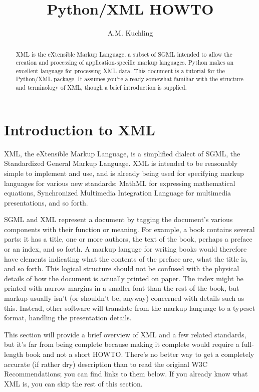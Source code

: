 \documentclass{howto}
\title{Python/XML HOWTO}
\author{A.M. Kuchling}
\begin{document}
\maketitle

\begin{abstract}
\noindent
XML is the eXtensible Markup Language, a subset of SGML intended to
allow the creation and processing of application-specific markup
languages.  Python makes an excellent language for processing XML
data.  This document is a tutorial for the Python/XML package.  It
assumes you're already somewhat familiar with the structure and
terminology of XML, though a brief introduction is supplied.
\end{abstract}

\tableofcontents


\section{Introduction to XML\label{section-introduction}}

XML, the eXtensible Markup Language, is a simplified dialect of SGML,
the Standardized General Markup Language.  XML is intended to be
reasonably simple to implement and use, and is already being used for
specifying markup languages for various new standards: MathML for
expressing mathematical equations, Synchronized Multimedia Integration
Language for multimedia presentations, and so forth.

SGML and XML represent a document by tagging the document's various
components with their function or meaning.  For example, a book
contains several parts: it has a title, one or more authors, the text
of the book, perhaps a preface or an index, and so forth.  A markup
languge for writing books would therefore have elements indicating
what the contents of the preface are, what the title is, and so forth.
This logical structure should not be confused with the physical
details of how the document is actually printed on paper.  The index
might be printed with narrow margins in a smaller font than the rest
of the book, but markup usually isn't (or shouldn't be, anyway)
concerned with details such as this.  Instead, other software will
translate from the markup language to a typeset format, handling the
presentation details.

This section will provide a brief overview of XML and a few related
standards, but it's far from being complete because making it complete
would require a full-length book and not a short HOWTO. There's no
better way to get a completely accurate (if rather dry) description
than to read the original W3C Recommendations; you can find links to
them below.  If you already
know what XML is, you can skip the rest of this section.
\end{document}
